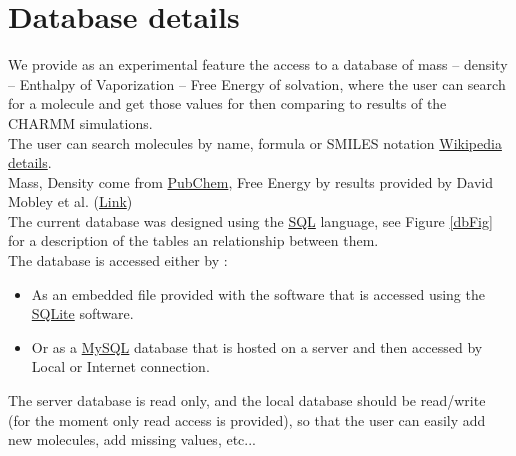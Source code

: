 \documentclass[12pt,a4paper]{article}
\begin{document}
\clearpage


%


\section{Database details}

We provide as an experimental feature the access to a database of 
mass -- density -- Enthalpy of Vaporization -- Free Energy of solvation, where the user can search 
for a molecule and get those values for then comparing to results of the CHARMM simulations.\\

The user can search molecules by name, formula or SMILES notation 
\href{http://en.wikipedia.org/wiki/Simplified_molecular-input_line-entry_system}{Wikipedia 
details}.\\

Mass, Density come from \href{https://pubchem.ncbi.nlm.nih.gov/search/}{PubChem}, Free Energy by 
results provided by David Mobley et al. (\href{http://escholarship.org/uc/item/6sd403pz}{Link})\\

The current database was designed using the \href{http://en.wikipedia.org/wiki/SQL}{SQL} 
language, see Figure \ref{dbFig} for a description of the tables an relationship between them.\\

The database is accessed either by : 
\begin{itemize}
\item As an embedded file provided with the software that is accessed using the 
\href{http://www.sqlite.org/}{SQLite} software.
\item Or as a \href{http://www.mysql.com/}{MySQL} database that is hosted on a server and then 
accessed by Local or Internet connection.
\end{itemize}

The server database is read only, and the local database should be read/write (for the moment only 
read access is provided), so that the user can easily add new molecules, add missing values, 
etc...\\
\end{document}
